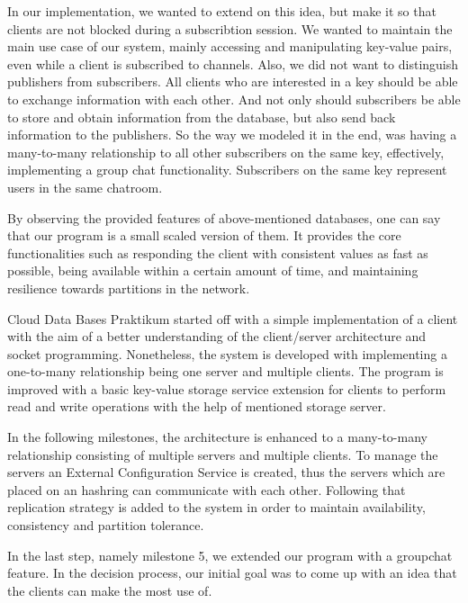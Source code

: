 
In our implementation, we wanted to extend on this idea, but make it so that clients are not blocked during a subscribtion session. We wanted to maintain the main use case of our system, mainly accessing and manipulating key-value pairs, even while a client is subscribed to channels. Also, we did not want to distinguish publishers from subscribers. All clients who are interested in a key should be able to exchange information with each other.
And not only should subscribers be able to store and obtain information from the database, but also send back information to the publishers. So the way we modeled it in the end, was having a many-to-many relationship to all other subscribers on the same key, effectively, implementing a group chat functionality. Subscribers on the same key represent users in the same chatroom. 

By observing the provided features of above-mentioned databases, one can say that our program is a small scaled version of them. It provides the core functionalities such as responding the client with consistent values as fast as possible, being available within a certain amount of time, and maintaining resilience towards partitions in the network.

Cloud Data Bases Praktikum started off with a simple implementation of a client with the aim of a better understanding of the client/server architecture and socket programming. Nonetheless, the system is developed with implementing a one-to-many relationship being one server and multiple clients. The program is improved with a basic key-value storage service extension for clients to perform read and write operations with the help of mentioned storage server. 

In the following milestones, the architecture is enhanced to a many-to-many relationship consisting of multiple servers and multiple clients. To manage the servers an External Configuration Service is created, thus the servers which are placed on an hashring can communicate with each other. Following that replication strategy is added to the system in order to maintain availability, consistency and partition tolerance. 

In the last step, namely milestone 5, we extended our program with a groupchat feature. In the decision process, our initial goal was to come up with an idea that the clients can make the most use of.

